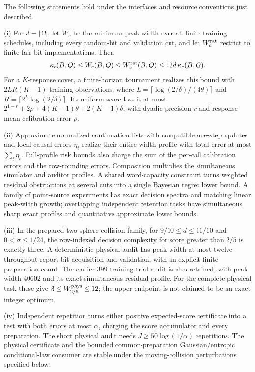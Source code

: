 \begin{theorem}
\label{thm:v21-main}
The following statements hold under the interfaces and resource
conventions just described.

\smallskip\noindent
\textup{(i)} For $d=|\Omega|$, let $W_c$ be the minimum peak width over
all finite training schedules, including every random-bit and validation
cut, and let $W_c^{\rm rat}$ restrict to finite fair-bit implementations.
Then
\[
 \kappa_c(B,Q)\le W_c(B,Q)\le W_c^{\rm rat}(B,Q)
                                \le12d\,\kappa_c(B,Q).
\]
For a $K$-response cover, a finite-horizon tournament realizes this bound
with $2LR(K-1)$ training observations, where
$L=\lceil\log(2/\delta)/(4\theta)\rceil$ and
$R=\lceil2^L\log(2/\delta)\rceil$. Its uniform score loss is at most
$2^{1-r}+2\rho+4(K-1)\theta+2(K-1)\delta$, with dyadic precision $r$
and response-mean calibration error $\rho$.

\smallskip\noindent
\textup{(ii)} Approximate normalized continuation lists with compatible
one-step updates and local causal errors $\eta_t$ realize their entire
width profile with total error at most $\sum_t\eta_t$. Full-profile
risk bounds also charge the sum of the per-call calibration errors and
the row-rounding errors. Composition multiplies the simultaneous
simulator and auditor profiles. A shared word-capacity constraint turns
weighted residual obstructions at several cuts into a single Bayesian
regret lower bound. A family of point-source experiments has exact
decision spectra and matching linear peak-width growth; overlapping
independent retention tasks have simultaneous sharp exact profiles and
quantitative approximate lower bounds.

\smallskip\noindent
\textup{(iii)} In the prepared two-sphere collision family, for
$9/10\le d\le11/10$ and $0<\sigma\le1/24$, the row-indexed decision
complexity for score greater than $2/5$ is exactly three. A deterministic
physical audit has peak width at most twelve throughout report-bit
acquisition and validation, with an explicit finite preparation count.
The earlier $399$-training-trial audit is also retained, with peak width
$40602$ and its exact simultaneous residual profile. For the complete
physical task these give $3\le W_{2/5}^{\rm phys}\le12$; the upper
endpoint is not claimed to be an exact integer optimum.

\smallskip\noindent
\textup{(iv)} Independent repetition turns either positive expected-score
certificate into a test with both errors at most $\alpha$, charging the
score accumulator and every preparation. The short physical audit needs
$J\ge50\log(1/\alpha)$ repetitions. The physical certificate and the
bounded common-preparation Gaussian/entropic conditional-law consumer
are stable under the moving-collision perturbations specified below.
\end{theorem}
